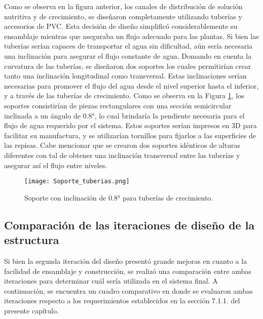 Como se observa en la figura anterior, los canales de distribución de solución nutritiva y de crecimiento, se diseñaron completamente utilizando tuberías y accesorios de PVC. Esta decisión de diseño simplificó considerablemente su ensamblaje mientras que aseguraba un flujo adecuado para las plantas. Si bien las tuberías serían capaces de transportar el agua sin dificultad, aún sería necesaria una inclinación para asegurar el flujo constante de agua. Domando en cuenta la curvatura de las tuberías, se diseñaron dos soportes los cuales permitirían crear tanto una inclinación longitudinal como transversal. Estas inclinaciones serían necesarias para promover el flujo del agua desde el nivel superior hasta el inferior, y a través de las tuberías de crecimiento. Como se observa en la Figura \ref{fig:soporte_tub}, los soportes consistirían de piezas rectangulares con una sección semicircular inclinada a un ángulo de 0.8°, lo cual brindaría la pendiente necesaria para el flujo de agua requerido por el sistema. Estos soportes serían impresos en 3D para facilitar su manufactura, y se utilizarían tornillos para fijarlos a las superficies de las repisas. Cabe mencionar que se crearon dos soportes idénticos de alturas diferentes con tal de obtener una inclinación transversal entre las tuberías y asegurar así el flujo entre niveles.

\begin{figure}[H]
	\centering
	\texttt{[image: Soporte\_tuberias.png]}
	\caption{Soporte con inclinación de 0.8° para tuberías de crecimiento.}
	\label{fig:soporte_tub}
\end{figure}

\subsection{Comparación de las iteraciones de diseño de la estructura}

Si bien la segunda iteración del diseño presentó grande mejoras en cuanto a la facilidad de ensamblaje y construcción, se realizó una comparación entre ambas iteraciones para determinar cuál sería utilizada en el sistema final. A continuación, se encuentra un cuadro comparativo en donde se evaluaron ambas iteraciones respecto a los requerimientos establecidos en la sección 7.1.1. del presente capítulo.


